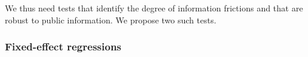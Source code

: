 

We thus need tests that identify the degree of information frictions and that are robust to public information. We propose two such tests.

\subsubsection{Fixed-effect regressions}

